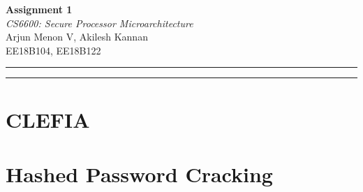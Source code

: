 \documentclass[12pt,a4paper,english]{paper}
\def \courseNumber {CS6600}
\def \courseName {Secure Processor Microarchitecture}
\def \assignmentName {Assignment 1}
\def \myName {Arjun Menon V, Akilesh Kannan}
\def \rollNumber {EE18B104, EE18B122}
\begin{document}
\thispagestyle{empty}
\vspace{-4.5cm}

\hspace*{-\parindent}
\begin{minipage}{0.65\textwidth}
\fontsize{22pt}{10pt}\selectfont\textbf{\assignmentName}\\[1mm]
\Large
\textit{\courseNumber: \courseName}\\[5mm]
\Large \myName \\[1mm]
\normalsize \rollNumber \\
\end{minipage}\hfill%

\hrule \hrule
\medskip

\section{CLEFIA}
\section{Hashed Password Cracking}
\end{document}
